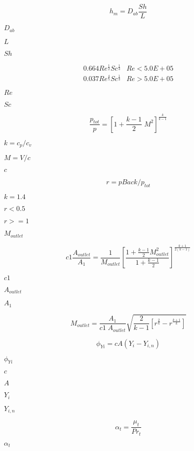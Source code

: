 \documentclass{article}
\begin{document}
\[ h_m = D_{ab} \frac{Sh}{L} \]
\pagebreak

$        D_{ab} $
\pagebreak

$        L      $
\pagebreak

$        Sh     $
\pagebreak

\begin{eqnarray*}
            0.664 Re^\frac{1}{2} Sc^\frac{1}{3} & Re < 5.0E+05 \\
            0.037 Re^\frac{4}{5} Sc^\frac{1}{3} & Re > 5.0E+05
    \end{eqnarray*}
\pagebreak

$        Re     $
\pagebreak

$        Sc     $
\pagebreak

\[
    \frac{p_{tot}}{p}=\left[ 1+ \frac{k-1}{2}\;M^2 \right]^{\frac{k}{k-1}}
\]
\pagebreak

$k=c_p/c_v$
\pagebreak

$M=V/c$
\pagebreak

$c$
\pagebreak

\[
    r =  pBack/p_{tot}
\]
\pagebreak

$k=1.4$
\pagebreak

$ r<0.5$
\pagebreak

$ r>=1 $
\pagebreak

$M_{outlet}$
\pagebreak

\[
    c1\frac{A_{outlet}}{A_1}=\frac{1}{M_{outlet}}\left[\frac{1+\frac{k-1}{2}
    M_{outlet}^2}{1+\frac{k-1}{2}}\right]^{\frac{k+1}{2(k-1)}}
\]
\pagebreak

$c1$
\pagebreak

$A_{outlet}$
\pagebreak

$A_1$
\pagebreak

\[
    M_{outlet} =
        \frac{A_1}
        {c1\;A_{outlet}}
        \sqrt{\frac{2}{k-1}\left[r^\frac{2}{k}-r^\frac{k+1}{k} \right]}
\]
\pagebreak

\[
        \phi_{Yi} = c A (Y_i - Y_{i,n})
    \]
\pagebreak

$            \phi_{Yi} $
\pagebreak

$            c         $
\pagebreak

$            A         $
\pagebreak

$            Y_i       $
\pagebreak

$            Y_{i,n}   $
\pagebreak

\[
        \alpha_t = \frac{\mu_t}{Pr_t}
    \]
\pagebreak

$        \alpha_t$
\pagebreak
\end{document}
